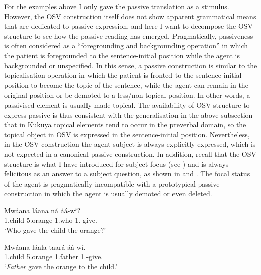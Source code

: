 \documentclass[output=paper,colorlinks,citecolor=brown,
]{langscibook}
\begin{document}
For the examples above I only gave the passive translation as a stimulus. However, the OSV construction itself does not show apparent grammatical means that are dedicated to passive expression, and here I want to decompose the OSV structure to see how the passive reading has emerged. Pragmatically, passiveness is often considered as a ``foregrounding and backgrounding operation” \citep{KeenanDryer2007} in which the patient is foregrounded to the sentence-initial position while the agent is backgrounded or unspecified. In this sense, a passive construction is similar to the topicalisation operation in which the patient is fronted to the sentence-initial position to become the topic of the sentence, while the agent can remain in the original position or be demoted to a less/non-topical position. In other words, a passivised element is usually made topical. The availability of OSV structure to express passive is thus consistent with the generalisation in the above subsection that in Kukuya topical elements tend to occur in the preverbal domain, so the topical object in OSV is expressed in the sentence-initial position. Nevertheless, in the OSV construction the agent subject is always explicitly expressed, which is not expected in a canonical passive construction. In addition, recall that the OSV structure is what I have introduced for subject focus (see ) and is always felicitous as an answer to a subject question, as shown in  and . The focal status of the agent is pragmatically incompatible with a prototypical passive construction in which the agent is usually demoted or even deleted.
\begin{exe}
    \ex \label{120}
    \begin{xlist}
\ex
\label{120a}
\gll
Mwáana láana ná áá-wî?\\
1.child 5.orange 1.who 1\Sm{}.\Pst{}-give.\Pst{}\\
\trans ‘Who gave the child the orange?’

\ex
\label{120b}
\gll
Mwáana láala taará áá-wî.\\
1.child 5.orange 1.father 1\Sm{}.\Pst{}-give.\Pst{}\\
\trans ‘\textit{Father} gave the orange to the child.’

    \end{xlist}
\end{exe}
\end{document}
